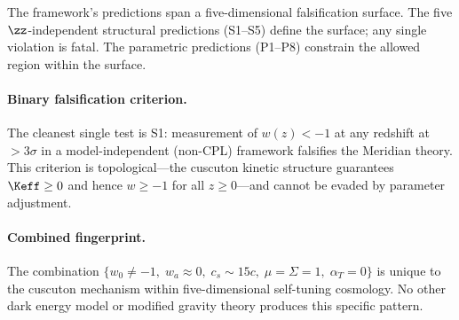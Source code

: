 The framework's predictions span a five-dimensional falsification surface. The five $\zz$-independent structural predictions (S1--S5) define the surface; any single violation is fatal. The parametric predictions (P1--P8) constrain the allowed region within the surface.

\paragraph{Binary falsification criterion.}
The cleanest single test is S1: measurement of $w(z) < -1$ at any redshift at $>3\sigma$ in a model-independent (non-CPL) framework falsifies the Meridian theory. This criterion is topological---the cuscuton kinetic structure guarantees $\Keff \geq 0$ and hence $w \geq -1$ for all $z \geq 0$---and cannot be evaded by parameter adjustment.

\paragraph{Combined fingerprint.}
The combination $\{w_0 \neq -1,\; w_a \approx 0,\; c_s \sim 15c,\; \mu = \Sigma = 1,\; \alpha_T = 0\}$ is unique to the cuscuton mechanism within five-dimensional self-tuning cosmology. No other dark energy model or modified gravity theory produces this specific pattern.
